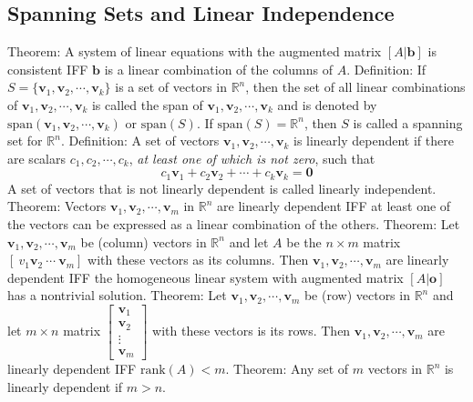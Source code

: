 \documentclass{article}
\begin{document}
    \subsection{Spanning Sets and Linear Independence}
    \begin{outline}
        \1 Theorem: A system of linear equations with the augmented matrix \([A|\mathbf b]\) is consistent IFF \(\mathbf b\) is a linear combination of the columns of \(A\). 
        \1 Definition: If \(S=\{\mathbf v_1,\mathbf v_2,\cdots,\mathbf v_k\}\) is a set of vectors in \(\mathbb R^n\), then the set of all linear combinations of \(\mathbf v_1,\mathbf v_2,\cdots,\mathbf v_k\) is called the span of \(\mathbf v_1,\mathbf v_2,\cdots,\mathbf v_k\) and is denoted by \(\text{span}(\mathbf v_1,\mathbf v_2,\cdots,\mathbf v_k)\) or \(\text{span}(S)\). If \(\text{span}(S)=\mathbb R^n\), then $S$ is called a spanning set for \(\mathbb R^n\). 
        \1 Definition: A set of vectors \(\mathbf v_1,\mathbf v_2,\cdots,\mathbf v_k\) is linearly dependent if there are scalars \(c_1,c_2,\cdots,c_k\), \textit{at least one of which is not zero}, such that \[c_1\mathbf v_1+c_2\mathbf v_2+\cdots+c_k\mathbf v_k=\mathbf 0\] A set of vectors that is not linearly dependent is called linearly independent. 
        \1 Theorem: Vectors \(\mathbf v_1,\mathbf v_2,\cdots,\mathbf v_m\) in \(\mathbb R^n\) are linearly dependent IFF at least one of the vectors can be expressed as a linear combination of the others. 
        \1 Theorem: Let \(\mathbf v_1,\mathbf v_2,\cdots,\mathbf v_m\) be (column) vectors in \(\mathbb{R}^n\) and let $A$ be the \(n\times m\) matrix \([\mathbf\:v_1\mathbf v_2\:\cdots\:\mathbf v_m]\) with these vectors as its columns. Then \(\mathbf v_1,\mathbf v_2,\cdots,\mathbf v_m\) are linearly dependent IFF the homogeneous linear system with augmented matrix \([A|\mathbf o]\) has a nontrivial solution. 
        \1 Theorem: Let \(\mathbf v_1,\mathbf v_2,\cdots,\mathbf v_m\) be (row) vectors in \(\mathbb R^n\) and let \(m\times n\) matrix $\begin{bmatrix}
            \mathbf v_1\\\mathbf v_2\\\vdots\\\mathbf v_m
        \end{bmatrix}$ with these vectors is its rows. Then \(\mathbf v_1,\mathbf v_2,\cdots,\mathbf v_m\) are linearly dependent IFF \(\text{rank}(A)<m\). 
        \1 Theorem: Any set of $m$ vectors in \(\mathbb R^n\) is linearly dependent if \(m>n\). 

    \end{outline}
\end{document}
